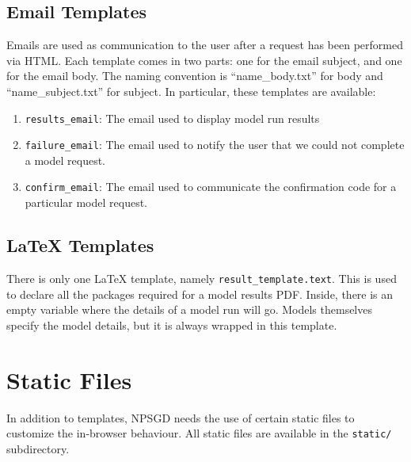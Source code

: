 \documentclass{article}
\newcommand{\mpath}[1]{\texttt{#1}}
\begin{document}
\subsection{Email Templates}
Emails are used as communication to the user after a request has been performed
via HTML. Each template comes in two parts: one for the email subject, and one
for the email body. The naming convention is ``name\_body.txt'' for body and
``name\_subject.txt'' for subject. In particular, these templates are available:
\begin{enumerate}
    \item \texttt{results\_email}: The email used to display model run results
    \item \texttt{failure\_email}: The email used to notify the user that we
    could not complete a model request.
    \item \texttt{confirm\_email}: The email used to communicate the
    confirmation code for a particular model request.
\end{enumerate}

\subsection{LaTeX Templates}
There is only one LaTeX template, namely \mpath{result\_template.text}. This is
used to declare all the packages required for a model results PDF. Inside, there
is an empty variable where the details of a model run will go. Models themselves
specify the model details, but it is always wrapped in this template.

\section{Static Files}
In addition to templates, NPSGD needs the use of certain static files to
customize the in-browser behaviour. All static files are available in the
\mpath{static/} subdirectory.
\end{document}
